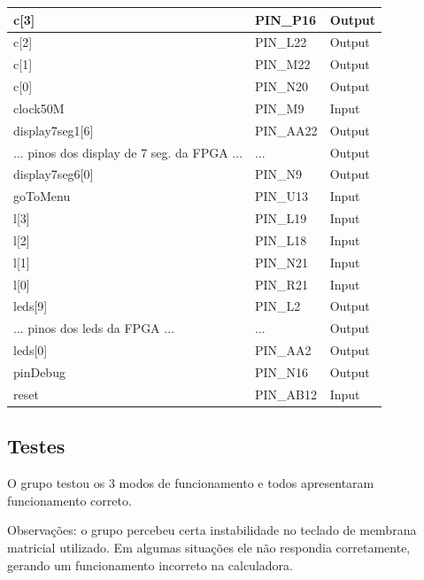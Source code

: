 \documentclass[12pt, a4paper]{article}
\begin{document}
	\begin{table}[H]
		\begin{center}
			\begin{tabular}{|l|l|l|}
				\hline
				c{[}3{]}            & PIN\_P16  & Output \\ \hline
				c{[}2{]}            & PIN\_L22  & Output \\ \hline
				c{[}1{]}            & PIN\_M22  & Output \\ \hline
				c{[}0{]}            & PIN\_N20  & Output \\ \hline
				clock50M            & PIN\_M9   & Input  \\ \hline
				display7seg1{[}6{]} & PIN\_AA22 & Output \\ \hline
				... pinos dos display de 7 seg. da FPGA ... & ...       & Output \\ \hline
				display7seg6{[}0{]} & PIN\_N9   & Output \\ \hline
				goToMenu            & PIN\_U13  & Input  \\ \hline
				l{[}3{]}            & PIN\_L19  & Input  \\ \hline
				l{[}2{]}            & PIN\_L18  & Input  \\ \hline
				l{[}1{]}            & PIN\_N21  & Input  \\ \hline
				l{[}0{]}            & PIN\_R21  & Input  \\ \hline
				leds{[}9{]}         & PIN\_L2   & Output \\ \hline
				... pinos dos leds da FPGA ...  & ...       & Output \\ \hline
				leds{[}0{]}         & PIN\_AA2  & Output \\ \hline
				pinDebug            & PIN\_N16  & Output \\ \hline
				reset               & PIN\_AB12 & Input  \\ \hline
			\end{tabular}
		\end{center}
	\end{table}
	
	\subsection{Testes}
	
	O grupo testou os 3 modos de funcionamento e todos apresentaram funcionamento correto.
	
	Observações: o grupo percebeu certa instabilidade no teclado de membrana matricial utilizado.
	Em algumas situações ele não respondia corretamente, gerando um funcionamento incorreto na calculadora.
	
\end{document}
